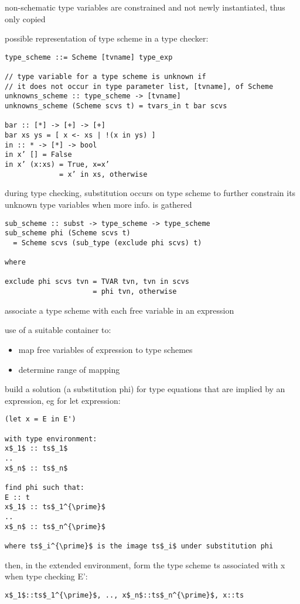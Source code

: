 \documentclass[8pt]{extarticle}
\begin{document}
\begin{multicols*}{2}
non-schematic type variables are constrained and not newly instantiated, thus only copied

possible representation of type scheme in a type checker:
\begin{verbatim}
type_scheme ::= Scheme [tvname] type_exp

// type variable for a type scheme is unknown if
// it does not occur in type parameter list, [tvname], of Scheme
unknowns_scheme :: type_scheme -> [tvname]
unknowns_scheme (Scheme scvs t) = tvars_in t bar scvs

bar :: [*] -> [+] -> [+]
bar xs ys = [ x <- xs | !(x in ys) ]
in :: * -> [*] -> bool
in x’ [] = False
in x’ (x:xs) = True, x=x’
             = x’ in xs, otherwise
\end{verbatim}

during type checking, substitution occurs on type scheme to further constrain its unknown type variables when more info. is gathered

\begin{verbatim}
sub_scheme :: subst -> type_scheme -> type_scheme
sub_scheme phi (Scheme scvs t)
  = Scheme scvs (sub_type (exclude phi scvs) t)

where

exclude phi scvs tvn = TVAR tvn, tvn in scvs
                     = phi tvn, otherwise
\end{verbatim}

associate a type scheme with each free variable in an expression

use of a suitable container to:
\begin{itemize}
\item map free variables of expression to type schemes
\item determine range of mapping
\end{itemize}

build a solution (a substitution phi) for type equations that are implied by an expression, eg for let expression:
\begin{lstlisting}
(let x = E in E')

with type environment:
x$_1$ :: ts$_1$
..
x$_n$ :: ts$_n$

find phi such that:
E :: t
x$_1$ :: ts$_1^{\prime}$
..
x$_n$ :: ts$_n^{\prime}$

where ts$_i^{\prime}$ is the image ts$_i$ under substitution phi
\end{lstlisting}

then, in the extended environment, form the type scheme ts associated with x when type checking E':
\begin{lstlisting}
x$_1$::ts$_1^{\prime}$, .., x$_n$::ts$_n^{\prime}$, x::ts
\end{lstlisting}


\end{multicols*}
\end{document}
